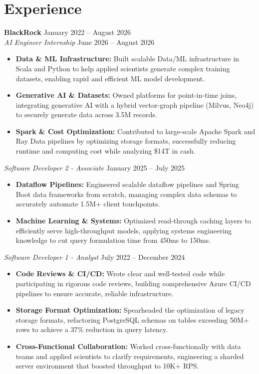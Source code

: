\documentclass[11pt,a4paper]{article}
\begin{document}
\section{Experience}
\noindent
\textbf{BlackRock} \hfill January 2022 -- August 2026 \\
\textit{AI Engineer Internship} \hfill June 2026 -- August 2026
\begin{itemize}[leftmargin=*,noitemsep,topsep=0pt]
    \item \textbf{Data \& ML Infrastructure:} Built scalable Data/ML infrastructure in Scala and Python to help applied scientists generate complex training datasets, enabling rapid and efficient ML model development.
    \item \textbf{Generative AI \& Datasets:} Owned platforms for point-in-time joins, integrating generative AI with a hybrid vector-graph pipeline (Milvus, Neo4j) to securely generate data across 3.5M records.
    \item \textbf{Spark \& Cost Optimization:} Contributed to large-scale Apache Spark and Ray Data pipelines by optimizing storage formats, successfully reducing runtime and computing cost while analyzing \$14T in cash.
\end{itemize}

\vspace{3pt}
\noindent
\textit{Software Developer 2 - Associate} \hfill January 2025 -- July 2025
\begin{itemize}[leftmargin=*,noitemsep,topsep=0pt]
    \item \textbf{Dataflow Pipelines:} Engineered scalable dataflow pipelines and Spring Boot data frameworks from scratch, managing complex data schemas to accurately automate 1.5M+ client touchpoints.
    \item \textbf{Machine Learning \& Systems:} Optimized read-through caching layers to efficiently serve high-throughput models, applying systems engineering knowledge to cut query formulation time from 450ms to 150ms.
\end{itemize}

\vspace{3pt}
\noindent
\textit{Software Developer 1 - Analyst} \hfill July 2022 -- December 2024
\begin{itemize}[leftmargin=*,noitemsep,topsep=0pt]
    \item \textbf{Code Reviews \& CI/CD:} Wrote clear and well-tested code while participating in rigorous code reviews, building comprehensive Azure CI/CD pipelines to ensure accurate, reliable infrastructure.
    \item \textbf{Storage Format Optimization:} Spearheaded the optimization of legacy storage formats, refactoring PostgreSQL schemas on tables exceeding 50M+ rows to achieve a 37\% reduction in query latency.
    \item \textbf{Cross-Functional Collaboration:} Worked cross-functionally with data teams and applied scientists to clarify requirements, engineering a sharded server environment that boosted throughput to 10K+ RPS.
\end{itemize}
\end{document}
